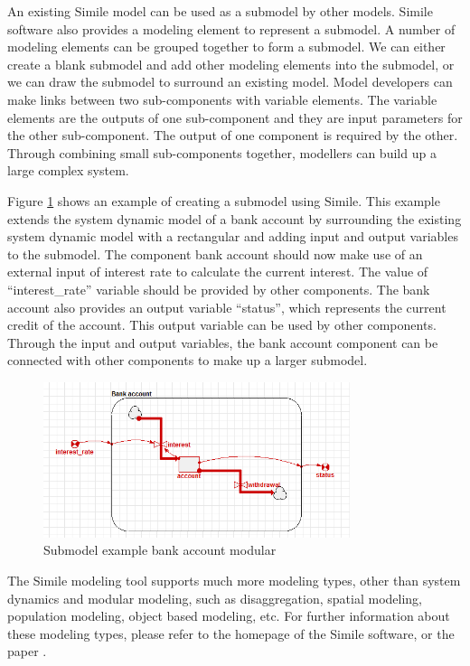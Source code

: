 \par
An existing Simile model can be used as a submodel by other models. Simile software also provides a modeling element to represent a submodel.  A number of modeling elements can be grouped together to form a submodel. We can either create a blank submodel and add other modeling elements into the submodel, or we can draw the submodel to surround an existing model. Model developers can make links between two sub-components with variable elements. The variable elements are the outputs of one sub-component and they are input parameters for the other sub-component. The output of one component is required by the other. Through combining small sub-components together, modellers can build up a large complex system.
\par
Figure \ref{fig:simile_example_submodel} shows an example of creating a submodel using Simile. This example extends the system dynamic model of a bank account by surrounding the existing system dynamic model with a rectangular and adding input and output variables to the submodel. The component bank account should now make use of an external input of interest rate to calculate the current interest. The value of ``interest\_rate'' variable should be provided by other components. The bank account also provides an output variable ``status'', which represents the current credit of the account. This output variable can be used by other components. Through the input and output variables, the bank account component can be connected with other components to make up a larger submodel.
\begin{figure}[h]
	\centering
	\includegraphics[width=0.8\textwidth]{pics/simile/simile_example_submodel.png}
	\caption{Submodel example bank account modular \label{fig:simile_example_submodel}}	
\end{figure}
\par
The Simile modeling tool supports much more modeling types, other than system dynamics and modular modeling, such as disaggregation, spatial modeling, population modeling, object based modeling, etc. For further information about these modeling types, please refer to the homepage of the Simile software, or the paper \autocite{dsl:simile-know}.
